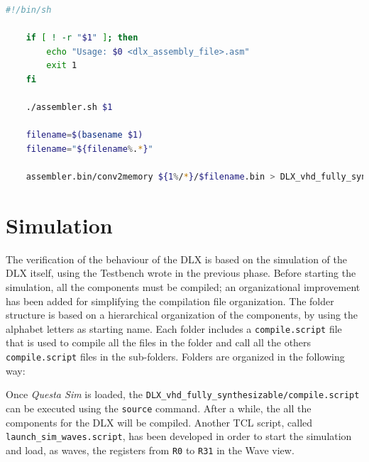 \begin{lstlisting}[language=bash,caption={Bash script for generating the .mem file from an .asm one},label=code:asm_script]
	#!/bin/sh
	
	if [ ! -r "$1" ]; then
		echo "Usage: $0 <dlx_assembly_file>.asm"
		exit 1
	fi
	
	./assembler.sh $1
	
	filename=$(basename $1)
	filename="${filename%.*}"
		
	assembler.bin/conv2memory ${1%/*}/$filename.bin > DLX_vhd_fully_synthesizable/test_bench_and_memory/mems/${filename}.asm.mem
\end{lstlisting}

\section{Simulation}
The verification of the behaviour of the DLX is based on the simulation of the DLX itself, using the Testbench wrote in the previous phase. Before starting the simulation, all the components must be compiled; an organizational improvement has been added for simplifying the compilation file organization. The folder structure is based on a hierarchical organization of the components, by using the alphabet letters as starting name. Each folder includes a \texttt{compile.script} file that is used to compile all the files in the folder and call all the others \texttt{compile.script} files in the sub-folders. Folders are organized in the following way:


\hfill


Once \textit{Questa Sim} is loaded, the \texttt{DLX\_vhd\_fully\_synthesizable/compile.script} can be executed using the \texttt{source} command. After a while, the all the components for the DLX will be compiled. Another TCL script, called \texttt{launch\_sim\_waves.script}, has been developed in order to start the simulation and load, as waves, the registers from \texttt{R0} to \texttt{R31} in the Wave view.

